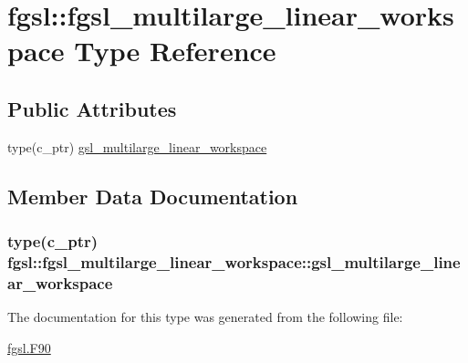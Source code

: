 \hypertarget{structfgsl_1_1fgsl__multilarge__linear__workspace}{}\section{fgsl\+:\+:fgsl\+\_\+multilarge\+\_\+linear\+\_\+workspace Type Reference}
\label{structfgsl_1_1fgsl__multilarge__linear__workspace}
\subsection*{Public Attributes}
\begin{DoxyCompactItemize}
\item 
type(c\+\_\+ptr) \hyperlink{structfgsl_1_1fgsl__multilarge__linear__workspace_a061e575e3d7f021e90d7f943831ddfd2}{gsl\+\_\+multilarge\+\_\+linear\+\_\+workspace}
\end{DoxyCompactItemize}


\subsection{Member Data Documentation}
\hypertarget{structfgsl_1_1fgsl__multilarge__linear__workspace_a061e575e3d7f021e90d7f943831ddfd2}{}
\subsubsection[{gsl\+\_\+multilarge\+\_\+linear\+\_\+workspace}]{\setlength{\rightskip}{0pt plus 5cm}type(c\+\_\+ptr) fgsl\+::fgsl\+\_\+multilarge\+\_\+linear\+\_\+workspace\+::gsl\+\_\+multilarge\+\_\+linear\+\_\+workspace}\label{structfgsl_1_1fgsl__multilarge__linear__workspace_a061e575e3d7f021e90d7f943831ddfd2}


The documentation for this type was generated from the following file\+:\begin{DoxyCompactItemize}
\item 
\hyperlink{fgsl_8F90}{fgsl.\+F90}\end{DoxyCompactItemize}
